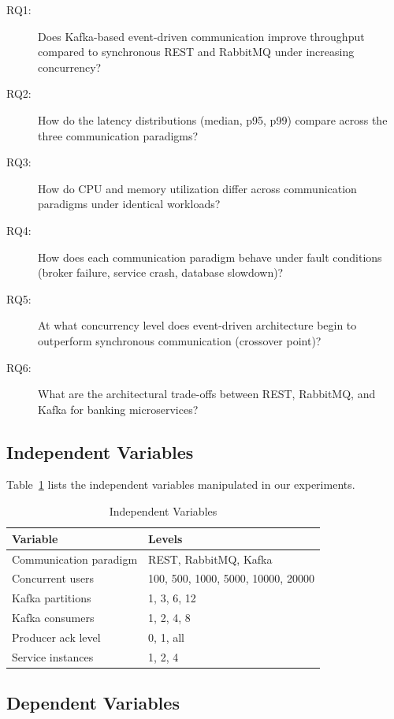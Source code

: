 \documentclass[journal]{IEEEtran}
\begin{document}
\begin{description}
    \item[RQ1:] Does Kafka-based event-driven communication improve throughput compared to synchronous REST and RabbitMQ under increasing concurrency?
    \item[RQ2:] How do the latency distributions (median, p95, p99) compare across the three communication paradigms?
    \item[RQ3:] How do CPU and memory utilization differ across communication paradigms under identical workloads?
    \item[RQ4:] How does each communication paradigm behave under fault conditions (broker failure, service crash, database slowdown)?
    \item[RQ5:] At what concurrency level does event-driven architecture begin to outperform synchronous communication (crossover point)?
    \item[RQ6:] What are the architectural trade-offs between REST, RabbitMQ, and Kafka for banking microservices?
\end{description}

\subsection{Independent Variables}
\label{subsec:independent_vars}

Table~\ref{tab:independent_vars} lists the independent variables manipulated in our experiments.

\begin{table}[!t]
\caption{Independent Variables}
\label{tab:independent_vars}
\centering
\scriptsize
\begin{tabularx}{\columnwidth}{lX}
\toprule
\textbf{Variable} & \textbf{Levels} \\
\midrule
Communication paradigm & REST, RabbitMQ, Kafka \\
Concurrent users & 100, 500, 1000, 5000, 10000, 20000 \\
Kafka partitions & 1, 3, 6, 12 \\
Kafka consumers & 1, 2, 4, 8 \\
Producer ack level & 0, 1, all \\
Service instances & 1, 2, 4 \\
\bottomrule
\end{tabularx}
\end{table}

\subsection{Dependent Variables}
\label{subsec:dependent_vars}
\end{document}
